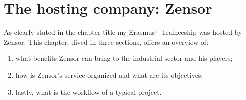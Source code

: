 \chapter{The hosting company: Zensor}\label{chapter:zensor}

As clearly stated in the chapter title my Erasmus$^{+}$ Traineeship was hosted by Zensor. 
This chapter, dived in three sections, offers an overview of:
\begin{enumerate}
    \item what benefits Zensor can bring to the industrial sector and his players;
    \item how is Zensor's service organized and what are its objectives;
    \item lastly, what is the workflow of a typical project.
\end{enumerate}




